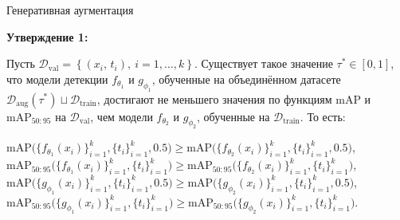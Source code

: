 \documentclass{beamer}
\begin{document}
\begin{frame}{Генеративная аугментация}

\textbf{Утверждение 1:}\par

Пусть $\mathcal{D}_{\text{val}} =
\left\{
  (x_i,\,t_i), \
  i = 1,\dots,k
\right\}$. Существует такое значение $\tau^*\in[0,1]$, что модели детекции $f_{\theta_1}$ и $g_{\phi_1}$, обученные на объединённом датасете $\mathcal{D}_{\mathrm{aug}}(\tau^*)\sqcup\mathcal{D}_{\mathrm{train}}$, достигают не меньшего значения по функциям $\mathrm{mAP}$ и $\mathrm{mAP}_{50:95}$ на $\mathcal{D}_{\text{val}}$, чем модели $f_{\theta_2}$ и $g_{\phi_2}$, обученные на $\mathcal{D}_{\text{train}}$. То есть:

\small{
\begin{center}
$\mathrm{mAP}\bigl(\{f_{\theta_1}(x_i)\}_{i=1}^k,\{t_i\}_{i=1}^k,0.5\bigr)\ge\mathrm{mAP}\bigl(\{f_{\theta_2}(x_i)\}_{i=1}^k,\{t_i\}_{i=1}^k,0.5\bigr)$,  
$\mathrm{mAP}_{50:95}\bigl(\{f_{\theta_1}(x_i)\}_{i=1}^k,\{t_i\}_{i=1}^k\bigr)\ge\mathrm{mAP}_{50:95}\bigl(\{f_{\theta_2}(x_i)\}_{i=1}^k,\{t_i\}_{i=1}^k\bigr)$,  
$\mathrm{mAP}\bigl(\{g_{\phi_1}(x_i)\}_{i=1}^k,\{t_i\}_{i=1}^k,0.5\bigr)\ge\mathrm{mAP}\bigl(\{g_{\phi_2}(x_i)\}_{i=1}^k,\{t_i\}_{i=1}^k,0.5\bigr)$,  
$\mathrm{mAP}_{50:95}\bigl(\{g_{\phi_1}(x_i)\}_{i=1}^k,\{t_i\}_{i=1}^k\bigr)\ge\mathrm{mAP}_{50:95}\bigl(\{g_{\phi_2}(x_i)\}_{i=1}^k,\{t_i\}_{i=1}^k\bigr)$.
\end{center}}

\end{frame}



\end{document}
